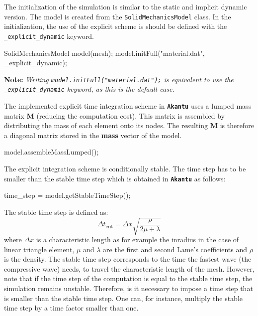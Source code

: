\documentclass[a4paper,11pt]{book}
\newcommand{\akantu}{{\texttt{\textbf{Akantu}}}\xspace}
\newcommand{\code}[1]{\texttt{#1}}
\newcommand{\note}[1]{\textbf{Note: }\textit{#1}}
\newcommand{\mat}[1]{\ensuremath{\boldsymbol{#1}}}
\newcommand{\st}[1]{{\mathrm{#1}}}
\begin{document}
The  initialization of  the simulation  is similar  to the  static  and implicit
dynamic  version.   The model  is  created  from the  \code{SolidMechanicsModel}
class.   In the  initialization, the  use of  the explicit  scheme is  should be
defined with the \code{\_explicit\_dynamic} keyword.

\begin{cpp}
  SolidMechanicsModel model(mesh);
  model.initFull("material.dat", _explicit_dynamic);
\end{cpp}

\note{Writing \code{model.initFull("material.dat");}  is equivalent to  use the
  \code{\_explicit\_dynamic} keyword, as this is the default case.}

The implemented explicit  time integration scheme in \akantu  uses a lumped mass
matrix $\mat{M}$  (reducing the computation  cost). This matrix is  assembled by
distributing the mass of each element onto its nodes. The resulting $\mat{M}$ is
therefore a diagonal matrix stored in the \textbf{mass} vector of the model.


\begin{cpp}
  model.assembleMassLumped();
\end{cpp}

The explicit integration scheme is conditionally stable. The time step has to be
smaller than the stable time step which is obtained in \akantu as follows:

\begin{cpp}
  time_step = model.getStableTimeStep();
\end{cpp}

The stable time step is defined as:
\begin{equation}
  \Delta t_{\st{crit}} = \Delta x \sqrt{\frac{\rho}{2 \mu +\lambda}}
\end{equation}\label{eqn:smm:explicit:stabletime}
where $\Delta x$  is a characteristic length as for example  the inradius in the
case of  linear triangle element, $\mu$  and $\lambda$ are the  first and second
Lame's coefficients and $\rho$ is the density.  The stable time step corresponds
to  the time  the  fastest wave  (the  compressive wave)  needs,  to travel  the
characteristic length of  the mesh.  However, note that if the  time step of the
computation  is  equal   to  the  stable  time  step,   the  simulation  remains
unstable. Therefore, is it necessary to  impose a time step that is smaller than
the stable time step. One can, for  instance, multiply the stable time step by a
time factor smaller than one.
\end{document}
